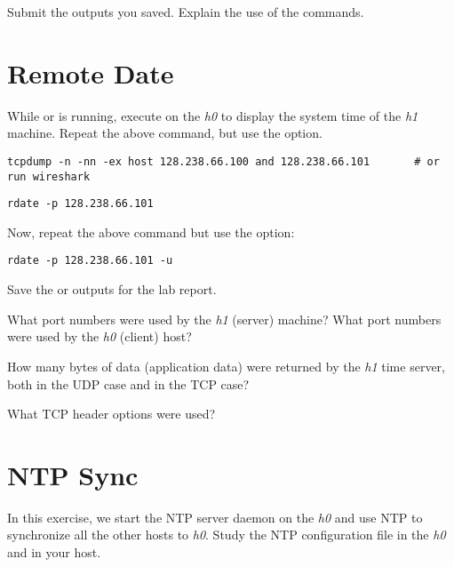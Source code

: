 \documentclass{../UTNetLab}
\begin{document}
\begin{report}
    \item Submit the  outputs you saved.
    Explain the use of the commands.
\end{report}

\section{Remote Date}
While  or  is running, execute  on the \textit{h0} to display the system time of the \textit{h1} machine.
Repeat the above  command, but use the  option.

\begin{lstlisting}
tcpdump -n -nn -ex host 128.238.66.100 and 128.238.66.101		# or run wireshark
\end{lstlisting}

\begin{lstlisting}
rdate -p 128.238.66.101
\end{lstlisting}

Now, repeat the above  command but use the  option:

\begin{lstlisting}
rdate -p 128.238.66.101 -u
\end{lstlisting}

Save the  or  outputs for the lab report.

\begin{report}
    \item What port numbers were used by the \textit{h1} (server) machine?
    What port numbers were used by the \textit{h0} (client) host?

    \item How many bytes of data (application data) were returned by the \textit{h1} time server, both in the UDP case and in the TCP case?

    \item What TCP header options were used?
\end{report}

\section{NTP Sync}
In this exercise, we start the NTP server daemon on the \textit{h0} and use NTP to
synchronize all the other hosts to \textit{h0}.
Study the NTP configuration file  in the \textit{h0} and in your host.
\end{document}
